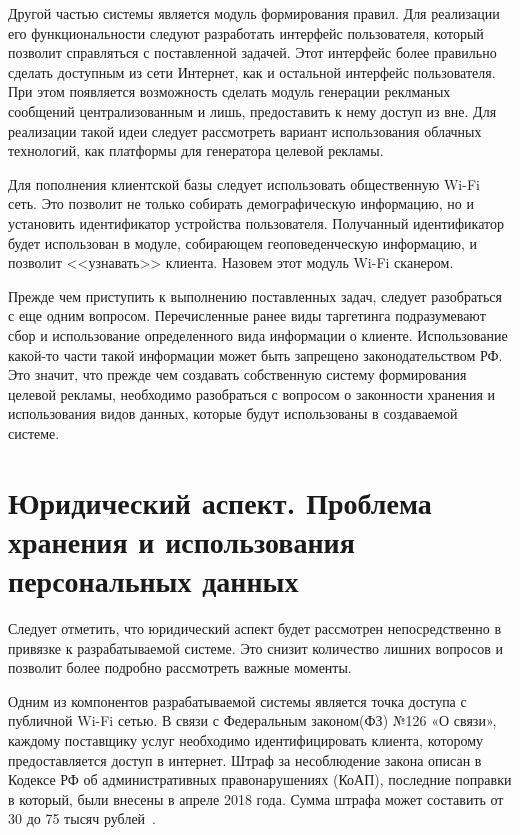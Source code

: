Другой частью системы является модуль формирования правил. Для реализации его функциональности следуют разработать интерфейс пользователя, который позволит справляться с поставленной задачей. Этот интерфейс более правильно сделать доступным из сети Интернет, как и остальной интерфейс пользователя. При этом появляется возможность сделать модуль генерации реклманых сообщений централизованным и лишь, предоставить к нему доступ из вне. Для реализации такой идеи следует рассмотреть вариант использования облачных технологий, как платформы для генератора целевой рекламы.

Для пополнения клиентской базы следует использовать общественную Wi-Fi сеть. Это позволит не только собирать демографическую информацию, но и установить идентификатор устройства пользователя. Получанный идентификатор будет использован в модуле, собирающем геоповеденческую информацию, и позволит <<узнавать>> клиента. Назовем этот модуль Wi-Fi сканером.

Прежде чем приступить к выполнению поставленных задач, следует разобраться с еще одним вопросом. Перечисленные ранее виды таргетинга подразумевают сбор и использование определенного вида информации о клиенте. Использование какой-то части такой информации может быть запрещено законодательством РФ. Это значит, что прежде чем создавать собственную систему формирования целевой рекламы, необходимо разобраться с вопросом о законности хранения и использования видов данных, которые будут использованы в создаваемой системе.

\section{Юридический аспект. Проблема хранения и использования персональных данных}

Следует отметить, что юридический аспект будет рассмотрен непосредственно в привязке к разрабатываемой системе. Это снизит количество лишних вопросов и позволит более подробно рассмотреть важные моменты.

Одним из компонентов разрабатываемой системы является точка доступа с публичной Wi-Fi сетью. В связи с Федеральным законом(ФЗ) №126 «О связи», каждому поставщику услуг необходимо идентифицировать клиента, которому предоставляется доступ в интернет. Штраф за несоблюдение закона описан в Кодексе РФ об административных правонарушениях (КоАП), последние поправки в который, были внесены в апреле 2018 года. Сумма штрафа может составить от 30 до 75 тысяч рублей~\cite{5myth}.

